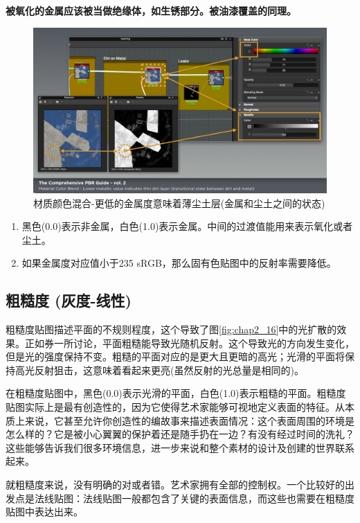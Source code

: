 \textbf{被氧化的金属应该被当做绝缘体，如生锈部分。被油漆覆盖的同理。}

\begin{figure}[ht]
    \centering
	\includegraphics[width=\textwidth]{images/chap2_15.png}
	\caption{材质颜色混合-更低的金属度意味着薄尘土层(金属和尘土之间的状态)}
    \label{fig:chap2_15}
\end{figure}

\begin{enumerate}
\item 黑色(0.0)表示非金属，白色(1.0)表示金属。中间的过渡值能用来表示氧化或者尘土。
\item 如果金属度对应值小于235 sRGB，那么固有色贴图中的反射率需要降低。
\end{enumerate}

\subsection{粗糙度 (灰度-线性)}

粗糙度贴图描述平面的不规则程度，这个导致了图\ref{fig:chap2_16}中的光扩散的效果。正如券一所讨论，平面粗糙能导致光随机反射。这个导致光的方向发生变化，但是光的强度保持不变。粗糙的平面对应的是更大且更暗的高光；光滑的平面将保持高光反射狙击，这意味着看起来更亮(虽然反射的光总量是相同的)。

在粗糙度贴图中，黑色(0.0)表示光滑的平面，白色(1.0)表示粗糙的平面。粗糙度贴图实际上是最有创造性的，因为它使得艺术家能够可视地定义表面的特征。从本质上来说，它甚至允许你创造性的编故事来描述表面情况：这个表面周围的环境是怎么样的？它是被小心翼翼的保护着还是随手扔在一边？有没有经过时间的洗礼？这些能够告诉我们很多环境信息，进一步来说和整个素材的设计及创建的世界联系起来。

就粗糙度来说，没有明确的对或者错。艺术家拥有全部的控制权。一个比较好的出发点是法线贴图：法线贴图一般都包含了关键的表面信息，而这些也需要在粗糙度贴图中表达出来。

